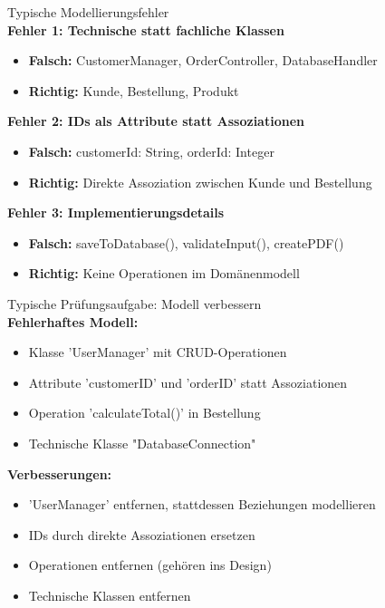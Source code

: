 \begin{corollary}{Typische Modellierungsfehler}\\
\textbf{Fehler 1: Technische statt fachliche Klassen}
\begin{itemize}
    \item \textbf{Falsch:} CustomerManager, OrderController, DatabaseHandler
    \item \textbf{Richtig:} Kunde, Bestellung, Produkt
\end{itemize}

\textbf{Fehler 2: IDs als Attribute statt Assoziationen}
\begin{itemize}
    \item \textbf{Falsch:} customerId: String, orderId: Integer
    \item \textbf{Richtig:} Direkte Assoziation zwischen Kunde und Bestellung
\end{itemize}

\textbf{Fehler 3: Implementierungsdetails}
\begin{itemize}
    \item \textbf{Falsch:} saveToDatabase(), validateInput(), createPDF()
    \item \textbf{Richtig:} Keine Operationen im Domänenmodell
\end{itemize}
\end{corollary}

\begin{example2}{Typische Prüfungsaufgabe: Modell verbessern}\\
\textbf{Fehlerhaftes Modell:}
\begin{itemize}
    \item Klasse 'UserManager' mit CRUD-Operationen
    \item Attribute 'customerID' und 'orderID' statt Assoziationen
    \item Operation 'calculateTotal()' in Bestellung
    \item Technische Klasse "DatabaseConnection"
\end{itemize}

\textbf{Verbesserungen:}
\begin{itemize}
    \item 'UserManager' entfernen, stattdessen Beziehungen modellieren
    \item IDs durch direkte Assoziationen ersetzen
    \item Operationen entfernen (gehören ins Design)
    \item Technische Klassen entfernen
\end{itemize}
\end{example2}




